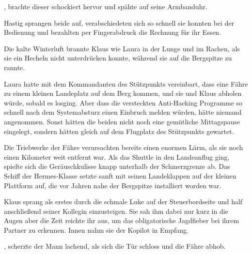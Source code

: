 \par

, brachte dieser schockiert hervor und spähte auf seine Armbanduhr. 

\par

Hastig sprangen beide auf, verabschiedeten sich so schnell sie konnten bei der Bedienung und bezahlten per Fingerabdruck die Rechnung für ihr Essen.

\par

Die kalte Winterluft brannte Klaus wie Laura in der Lunge und im Rachen, als sie ein Hecheln nicht unterdrücken konnte, während sie auf die Bergspitze zu rannte.

\par

Laura hatte mit dem Kommandanten des Stützpunkts vereinbart, dass eine Fähre zu einem kleinen Landeplatz auf dem Berg kommen, und sie und Klaus abholen würde, sobald es losging. Aber dass die versteckten Anti-Hacking Programme so schnell nach dem Systemabsturz einen Einbruch melden würden, hätte niemand angenommen. Sonst hätten die beiden nicht noch eine gemütliche Mittagspause eingelegt, sondern hätten gleich auf dem Flugplatz des Stützpunkts gewartet.

\par

Die Triebwerke der Fähre verursachten bereits einen enormen Lärm, als sie noch einen Kilometer weit entfernt war. Als das Shuttle in den Landeanflug ging, spielte sich die Geräuschkulisse knapp unterhalb der Schmerzgrenze ab. Das Schiff der Hermes-Klasse setzte sanft mit seinen Landeklappen auf der kleinen Plattform auf, die vor Jahren nahe der Bergspitze installiert worden war.

\par

Klaus sprang als erstes durch die schmale Luke auf der Steuerbordseite und half anschließend seiner Kollegin einzusteigen. Sie sah ihm dabei nur kurz in die Augen aber die Zeit reichte ihr aus, um das obligatorische Jagdfieber bei ihrem Partner zu erkennen. Innen nahm sie der Kopilot in Empfang.

\par

, scherzte der Mann lachend, als sich die Tür schloss und die Fähre abhob. 

